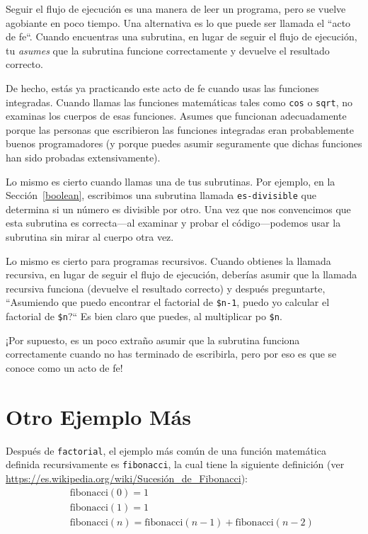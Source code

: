 Seguir el flujo de ejecución es una manera de leer un programa,
pero se vuelve agobiante en poco tiempo. Una alternativa es 
lo que puede ser llamada el ``acto de fe``. Cuando encuentras 
una subrutina, en lugar de seguir el flujo de ejecución,
tu \emph{asumes} que la subrutina funcione correctamente y devuelve
el resultado correcto.


De hecho, estás ya practicando este acto de fe cuando usas las funciones
integradas. Cuando llamas las funciones matemáticas tales como {\tt cos} 
o {\tt sqrt}, no examinas los cuerpos de esas funciones. Asumes que funcionan
adecuadamente porque las personas que escribieron las funciones 
integradas eran probablemente buenos programadores (y porque puedes
asumir seguramente que dichas funciones han sido probadas extensivamente).

Lo mismo es cierto cuando llamas una de tus subrutinas. Por ejemplo,
en la Sección~\ref{boolean}, escribimos una subrutina llamada \verb|es-divisible|
que determina si un número es divisible por otro. Una vez que nos convencimos
que esta subrutina es correcta---al examinar y probar el código---podemos
usar la subrutina sin mirar al cuerpo otra vez.

Lo mismo es cierto para programas recursivos. Cuando obtienes la
llamada recursiva, en lugar de seguir el flujo de ejecución, deberías
asumir que la llamada recursiva funciona (devuelve el resultado correcto)
y después preguntarte, ``Asumiendo que puedo encontrar el factorial de
\verb|$n-1|, puedo yo calcular el factorial de \verb|$n|?`` Es bien claro 
que puedes, al multiplicar po \verb|$n|.

¡Por supuesto, es un poco extraño asumir que la subrutina funciona correctamente
cuando no has terminado de escribirla, pero por eso es que se conoce 
como un acto de fe!


\section{Otro Ejemplo Más}
\label{one.more.example}

Después de {\tt factorial}, el ejemplo más común de una función
matemática definida recursivamente es {\tt fibonacci}, la cual tiene
la siguiente definición (ver
  \url{https://es.wikipedia.org/wiki/Sucesión_de_Fibonacci}):
%
\begin{eqnarray*}
&& \mathrm{fibonacci}(0) = 1 \\
&& \mathrm{fibonacci}(1) = 1 \\
&& \mathrm{fibonacci}(n) = \mathrm{fibonacci}(n-1) + \mathrm{fibonacci}(n-2)
\end{eqnarray*}
%

